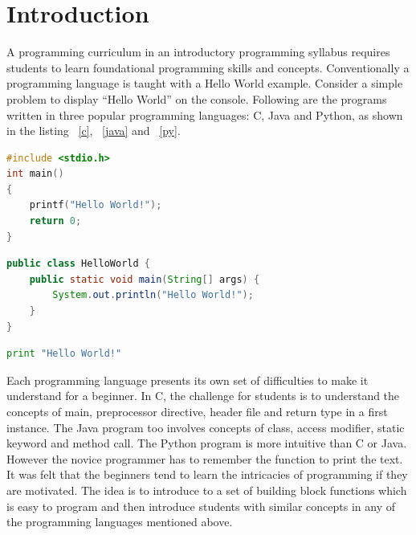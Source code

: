 
\chapter{Introduction}\label{chap:intro}

A programming curriculum in an introductory programming syllabus requires students to learn foundational programming skills and concepts. Conventionally a programming language is taught with a Hello World example. Consider a simple problem to display “Hello World” 
on the console. Following are the programs written in three popular programming 
languages: C, Java and Python, as shown in the listing ~\ref{c}, ~\ref{java} and ~\ref{py}.

\begin{lstlisting}[language=C,caption=Hello World program in C,label=c,showstringspaces=false,columns=flexible,basicstyle={\small\ttfamily}]
#include <stdio.h>
int main() 
{
    printf("Hello World!");
    return 0;
}
\end{lstlisting}

\begin{lstlisting}[language=Java,caption=Hello World program in Java,label=java,showstringspaces=false,columns=flexible,basicstyle={\small\ttfamily}]
public class HelloWorld {
    public static void main(String[] args) {
        System.out.println("Hello World!");
    }
}
\end{lstlisting}

\begin{lstlisting}[language=Python,caption=Hello World program in Python,label=py,showstringspaces=false,columns=flexible,basicstyle={\small\ttfamily}]
print "Hello World!"
\end{lstlisting}

Each programming language presents its own set of difficulties to make it understand for a beginner. In C, the challenge for students is to understand the concepts of main, preprocessor directive, header file and return type in a first instance. The Java program too involves concepts of class, access modifier, static keyword and method call. The Python program is more intuitive  than C or Java. However the novice programmer has to remember the function to print the text. It was felt that the beginners tend to learn the intricacies of programming if they are motivated. The idea is to introduce to a set of building block functions which is easy to program and then introduce students with similar concepts in any of the programming languages mentioned above.

